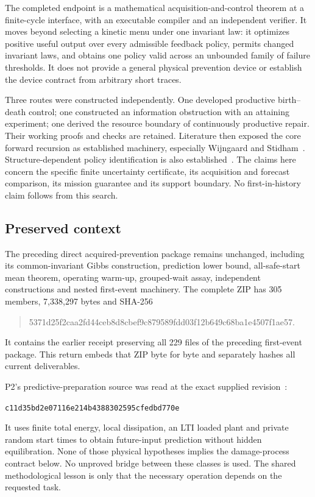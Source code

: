 \documentclass[10pt,a4paper]{article}
\begin{document}
The completed endpoint is a mathematical acquisition-and-control theorem at a finite-cycle interface, with an executable compiler and an independent verifier. It moves beyond selecting a kinetic menu under one invariant law: it optimizes positive useful output over every admissible feedback policy, permits changed invariant laws, and obtains one policy valid across an unbounded family of failure thresholds. It does not provide a general physical prevention device or establish the device contract from arbitrary short traces.

Three routes were constructed independently. One developed productive birth--death control; one constructed an information obstruction with an attaining experiment; one derived the resource boundary of continuously productive repair. Their working proofs and checks are retained. Literature then exposed the core forward recursion as established machinery, especially Wijngaard and Stidham~\cite{wijngaard}. Structure-dependent policy identification is also established~\cite{zanette}. The claims here concern the specific finite uncertainty certificate, its acquisition and forecast comparison, its mission guarantee and its support boundary. No first-in-history claim follows from this search.

\subsection{Preserved context}

The preceding direct acquired-prevention package remains unchanged, including its common-invariant Gibbs construction, prediction lower bound, all-safe-start mean theorem, operating warm-up, grouped-wait assay, independent constructions and nested first-event machinery. The complete ZIP has 305 members, 7,338,297 bytes and SHA-256
\begin{quote}\small\ttfamily
5371d25f2caa2fd44ceb8d8cbef9c879589fdd03f12b649c68ba1e4507f1ae57.
\end{quote}
It contains the earlier receipt preserving all 229 files of the preceding first-event package. This return embeds that ZIP byte for byte and separately hashes all current deliverables.

P2's predictive-preparation source was read at the exact supplied revision~\cite{p2}:
\begin{center}\small\texttt{c11d35bd2e07116e214b4388302595cfedbd770e}\end{center}
It uses finite total energy, local dissipation, an LTI loaded plant and private random start times to obtain future-input prediction without hidden equilibration. None of those physical hypotheses implies the damage-process contract below. No unproved bridge between these classes is used. The shared methodological lesson is only that the necessary operation depends on the requested task.
\end{document}
